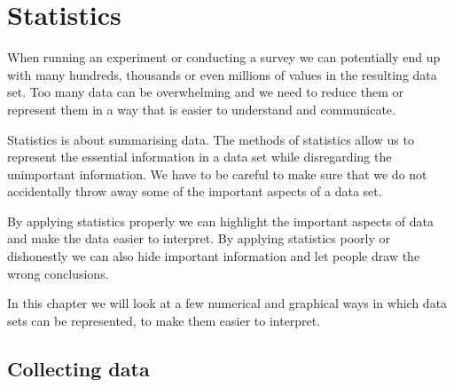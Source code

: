 \chapter{Statistics}


When running an experiment or conducting a survey we can potentially
end up with many hundreds, thousands or even millions of values in the
resulting data set. Too many data can be overwhelming and we need to
reduce them or represent them in a way that is easier to understand
and communicate.\par

Statistics is about summarising data. The methods of statistics allow
us to represent the essential information in a data set while
disregarding the unimportant information. We have to be careful to
make sure that we do not accidentally throw away some of the important
aspects of a data set.


\par
By applying statistics properly we can highlight the important aspects
of data and make the data easier to interpret. By applying statistics
poorly or dishonestly we can also hide important information and let
people draw the wrong conclusions.\par

In this chapter we will look at a few numerical and graphical ways in
which data sets can be represented, to make them easier to interpret.
\section{Collecting data}

